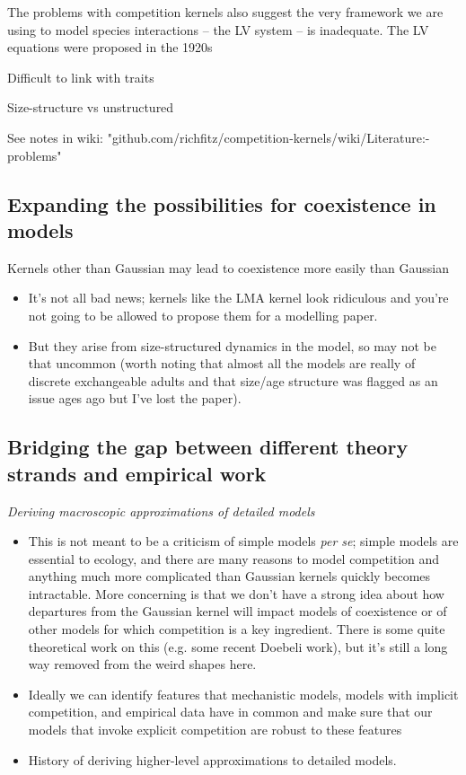 \documentclass[a4paper,11pt]{article}
\begin{document}
The problems with competition kernels also suggest the very framework we are
using to model species interactions -- the LV system -- is inadequate. The
LV equations were proposed in the 1920s \citep{Volterra-1928}


Difficult to link with traits

Size-structure vs unstructured

See notes in wiki:
"github.com/richfitz/competition-kernels/wiki/Literature:-problems"

\subsection{Expanding the possibilities for coexistence in models}

Kernels other than Gaussian may lead to coexistence more easily
  than Gaussian

\begin{itemize}
\item It's not all bad news; kernels like the LMA kernel look
  ridiculous and you're not going to be allowed to propose them for
  a modelling paper.
\item But they arise from size-structured dynamics in the model, so
  may not be that uncommon (worth noting that almost all the models
  are really of discrete exchangeable adults and that size/age
  structure was flagged as an issue ages ago but I've lost the
  paper).
\end{itemize}


\subsection{Bridging the gap between different theory strands and 
empirical work}

\textit{Deriving macroscopic approximations of detailed models}

\begin{itemize}
 \item This is not meant to be a criticism of simple models \textit{per
  se}; simple models are essential to ecology, and there are many
  reasons to model competition and anything much more complicated than
  Gaussian kernels quickly becomes intractable.  More concerning is
  that we don't have a strong idea about how departures from the
  Gaussian kernel will impact models of coexistence or of other models
  for which competition is a key ingredient.  There is some quite
  theoretical work on this (e.g. some recent Doebeli work), but it's
  still a long way removed from the weird shapes here.
\item Ideally we can identify features that mechanistic models, models
  with implicit competition, and empirical data have in common and make
  sure that our models that invoke explicit competition are robust to
  these features
\item History of deriving higher-level approximations to detailed models. 
\end{itemize}
\end{document}
